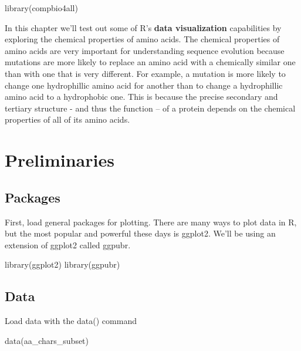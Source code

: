 \documentclass[
]{book}
\newenvironment{Shaded}{\begin{snugshade}}{\end{snugshade}}
\newcommand{\FunctionTok}[1]{\textcolor[rgb]{0.00,0.00,0.00}{#1}}
\newcommand{\NormalTok}[1]{#1}
\begin{document}
\begin{Shaded}
\begin{Highlighting}[]
\FunctionTok{library}\NormalTok{(compbio4all)}
\end{Highlighting}
\end{Shaded}

In this chapter we'll test out some of R's \textbf{data visualization} capabilities by exploring the chemical properties of amino acids. The chemical properties of amino acids are very important for understanding sequence evolution because mutations are more likely to replace an amino acid with a chemically similar one than with one that is very different. For example, a mutation is more likely to change one hydrophillic amino acid for another than to change a hydrophillic amino acid to a hydrophobic one. This is because the precise secondary and tertiary structure - and thus the function -- of a protein depends on the chemical properties of all of its amino acids.

\hypertarget{preliminaries-3}{%
\section{Preliminaries}\label{preliminaries-3}}

\hypertarget{packages-3}{%
\subsection{Packages}\label{packages-3}}

First, load general packages for plotting. There are many ways to plot data in R, but the most popular and powerful these days is ggplot2. We'll be using an extension of ggplot2 called ggpubr.

\begin{Shaded}
\begin{Highlighting}[]
\FunctionTok{library}\NormalTok{(ggplot2)}
\FunctionTok{library}\NormalTok{(ggpubr)}
\end{Highlighting}
\end{Shaded}

\hypertarget{data}{%
\subsection{Data}\label{data}}

Load data with the data() command

\begin{Shaded}
\begin{Highlighting}[]
\FunctionTok{data}\NormalTok{(aa\_chars\_subset)}
\end{Highlighting}
\end{Shaded}
\end{document}
